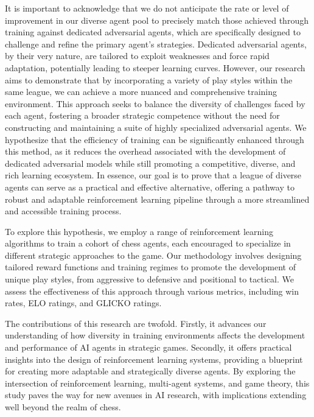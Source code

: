 \documentclass[journal]{IEEEtran}
\begin{document}
	It is important to acknowledge that we do not anticipate the rate or level of improvement 
	in our diverse agent pool to precisely match those achieved through training against dedicated adversarial agents, 
	which are specifically designed to challenge and refine the primary agent's strategies. 
	Dedicated adversarial agents, by their very nature, are tailored to exploit weaknesses and force rapid adaptation, 
	potentially leading to steeper learning curves. However, our research aims to demonstrate that by incorporating a variety 
	of play styles within the same league, we can achieve a more nuanced and comprehensive training environment. 
	This approach seeks to balance the diversity of challenges faced by each agent, fostering a broader strategic competence 
	without the need for constructing and maintaining a suite of highly specialized adversarial agents. 
	We hypothesize that the efficiency of training can be significantly enhanced through this method,
	as it reduces the overhead associated with the development of 
	dedicated adversarial models while still promoting a competitive, diverse, and rich learning ecosystem. 
	In essence, our goal is to prove that a league of diverse agents can serve as a practical and effective alternative, 
	offering a pathway to robust and adaptable reinforcement learning pipeline through a more streamlined and accessible training process.
		
	To explore this hypothesis, we employ a range of reinforcement learning algorithms to train a cohort of chess agents, each encouraged to specialize in different strategic approaches to the game. 
	Our methodology involves designing tailored reward functions and training regimes to promote the development of unique play styles, 
	from aggressive to defensive and positional to tactical. 
	We assess the effectiveness of this approach through various metrics, including win rates, ELO ratings,
	and GLICKO ratings.
		
	The contributions of this research are twofold. 
	Firstly, it advances our understanding of how diversity in training environments affects 
	the development and performance of AI agents in strategic games. 
	Secondly, it offers practical insights into the design of reinforcement learning systems, 
	providing a blueprint for creating more adaptable and strategically diverse agents. 
	By exploring the intersection of reinforcement learning, multi-agent systems, and game theory, 
	this study paves the way for new avenues in AI research, with implications extending well beyond the realm of chess.
\end{document}
